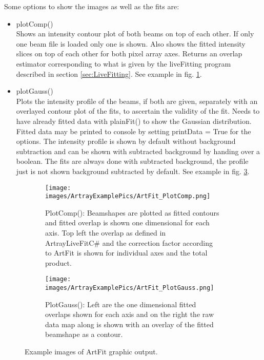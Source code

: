 \documentclass[twoside,openright,listof=numbered]{scrreprt}
\begin{document}
Some options to show the images as well as the fits are:
\begin{itemize}
\item plotComp()\\
Shows an intensity contour plot of both beams on top of each other. If only one beam file is loaded only one is shown. Also shows the fitted intensity slices on top of each other for both pixel array axes. Returns an overlap estimator corresponding to what is given by the liveFitting program described in section \ref{sec:LiveFitting}. See example in fig. \ref{fig:plotComp}.
\item plotGauss()\\
Plots the intensity profile of the beams, if both are given, separately with an overlayed contour plot of the fits, to ascertain the validity of the fit. Needs to have already fitted data with plainFit() to show the Gaussian distribution. Fitted data may be printed to console by setting printData = True for the options. The intensity profile is shown by default without background subtraction and can be shown with subtracted background by handing over a boolean. The fits are always done with subtracted background, the profile just is not shown background subtracted by default. See example in fig. \ref{fig:plotGauss}.
\end{itemize}

\begin{figure}[hbtp]
\centering
\begin{subfigure}[t]{0.49\linewidth}
\centering
\texttt{[image: images/ArtrayExamplePics/ArtFit\_PlotComp.png]}
\caption{PlotComp(): Beamshapes are plotted as fitted contours and fitted overlap is shown one dimensional for each axis. Top left the overlap as defined in ArtrayLiveFitC\# and the correction factor according to ArtFit is shown for individual axes and the total product.\label{fig:plotComp}}
\end{subfigure}
\hfill
\begin{subfigure}[t]{0.49\linewidth}
\centering
\texttt{[image: images/ArtrayExamplePics/ArtFit\_PlotGauss.png]}
\caption{PlotGauss(): Left are the one dimensional fitted overlaps shown for each axis and on the right the raw data map along is shown with an overlay of the fitted beamshape as a contour.\label{fig:plotGauss}}
\end{subfigure}
\caption{Example images of ArtFit graphic output.}
\end{figure}
\end{document}
